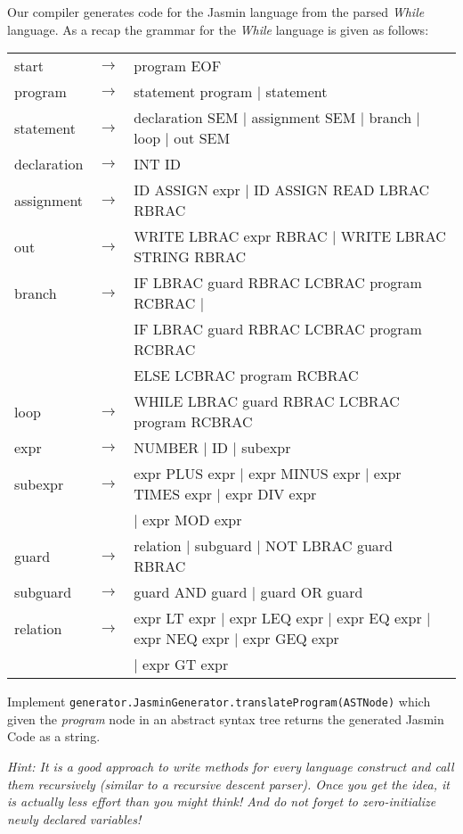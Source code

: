 \documentclass[a4paper]{article}
\begin{document}
\begin{exercise}{10}
  Our compiler generates code for the Jasmin language from the parsed \textit{While} language. As a recap the grammar for the \textit{While} language is given as follows:
  \begin{center}
  \begin{tabular}{lll}
    start       &$\to$ & program EOF\\
    program     &$\to$ & statement program $\mid$ statement\\
    statement   &$\to$ & declaration SEM $\mid$ assignment SEM $\mid$ branch $\mid$ loop $\mid$ out SEM\\
    declaration &$\to$ & INT ID\\
    assignment  &$\to$ & ID ASSIGN expr $\mid$ ID ASSIGN READ LBRAC RBRAC\\
    out         &$\to$ & WRITE LBRAC expr RBRAC $\mid$ WRITE LBRAC STRING RBRAC\\
    branch      &$\to$ & IF LBRAC guard RBRAC LCBRAC program RCBRAC $\mid$\\
                &      & IF LBRAC guard RBRAC LCBRAC program RCBRAC\\
                &      & ELSE LCBRAC program RCBRAC\\
    loop        &$\to$ & WHILE LBRAC guard RBRAC LCBRAC program RCBRAC\\
    expr        &$\to$ & NUMBER $\mid$ ID $\mid$ subexpr\\
    subexpr     &$\to$ & expr PLUS expr $\mid$ expr MINUS expr $\mid$ expr TIMES expr $\mid$ expr DIV expr\\
                &      & $\mid$ expr MOD expr\\
    guard       &$\to$ & relation $\mid$ subguard $\mid$ NOT LBRAC guard RBRAC\\
    subguard    &$\to$ & guard AND guard $\mid$ guard OR guard\\
    relation    &$\to$ & expr LT expr $\mid$ expr LEQ expr $\mid$ expr EQ expr $\mid$ expr NEQ expr $\mid$ expr GEQ expr\\
                &      & $\mid$ expr GT expr
  \end{tabular}
  \end{center}

Implement \texttt{generator.JasminGenerator.translateProgram(ASTNode)} which given the \emph{program} node in an abstract syntax tree returns the generated Jasmin Code as a string.

\emph{Hint: It is a good approach to write methods for every language construct and call them recursively (similar to a recursive descent parser). Once you get the idea, it is actually less effort than you might think! And do not forget to zero-initialize newly declared variables!}


\end{exercise}
\end{document}
